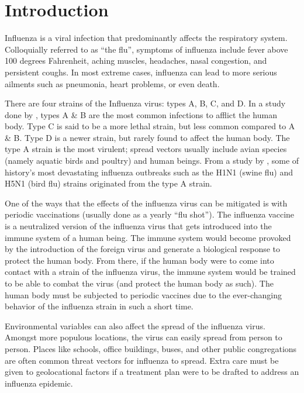 \documentclass[12pt]{article}
\begin{document}
\tableofcontents

\newpage

\section{Introduction}

Influenza is a viral infection that predominantly affects the respiratory system. Colloquially referred to as “the flu”, symptoms of influenza include fever above 100 degrees Fahrenheit, aching muscles, headaches, nasal congestion, and persistent coughs. In most extreme cases, influenza can lead to more serious ailments such as pneumonia, heart problems, or even death.

There are four strains of the Influenza virus: types A, B, C, and D. In a study done by  \cite{plos-one}, types A \& B are the most common infections to afflict the human body. Type C is said to be a more lethal strain, but less common compared to A \& B. Type D is a newer strain, but rarely found to affect the human body. The type A strain is the most virulent; spread vectors usually include avian species (namely aquatic birds and poultry) and human beings. From a study by \cite{virulence}, some of history’s most devastating influenza outbreaks such as the H1N1 (swine flu) and H5N1 (bird flu) strains originated from the type A strain.

One of the ways that the effects of the influenza virus can be mitigated is with periodic vaccinations (usually done as a yearly “flu shot”). The influenza vaccine is a neutralized version of the influenza virus that gets introduced into the immune system of a human being. The immune system would become provoked by the introduction of the foreign virus and generate a biological response to protect the human body. From there, if the human body were to come into contact with a strain of the influenza virus, the immune system would be trained to be able to combat the virus (and protect the human body as such). The human body must be subjected to periodic vaccines due to the ever-changing behavior of the influenza strain in such a short time.

Environmental variables can also affect the spread of the influenza virus. Amongst more populous locations, the virus can easily spread from person to person. Places like schools, office buildings, buses, and other public congregations are often common threat vectors for influenza to spread. Extra care must be given to geolocational factors if a treatment plan were to be drafted to address an influenza epidemic.
\end{document}
